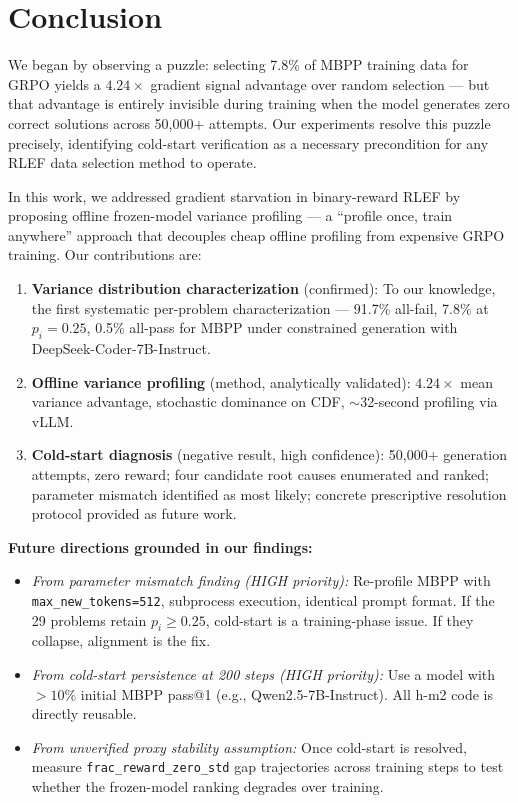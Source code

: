 \section{Conclusion}

We began by observing a puzzle: selecting 7.8\% of MBPP training data for GRPO yields a $4.24\times$ gradient signal advantage over random selection --- but that advantage is entirely invisible during training when the model generates zero correct solutions across 50,000+ attempts. Our experiments resolve this puzzle precisely, identifying cold-start verification as a necessary precondition for any RLEF data selection method to operate.

In this work, we addressed gradient starvation in binary-reward RLEF by proposing offline frozen-model variance profiling --- a ``profile once, train anywhere'' approach that decouples cheap offline profiling from expensive GRPO training. Our contributions are:

\begin{enumerate}
\item \textbf{Variance distribution characterization} (confirmed): To our knowledge, the first systematic per-problem characterization --- 91.7\% all-fail, 7.8\% at $p_i=0.25$, 0.5\% all-pass for MBPP under constrained generation with DeepSeek-Coder-7B-Instruct.

\item \textbf{Offline variance profiling} (method, analytically validated): $4.24\times$ mean variance advantage, stochastic dominance on CDF, $\sim$32-second profiling via vLLM.

\item \textbf{Cold-start diagnosis} (negative result, high confidence): 50,000+ generation attempts, zero reward; four candidate root causes enumerated and ranked; parameter mismatch identified as most likely; concrete prescriptive resolution protocol provided as future work.
\end{enumerate}

\textbf{Future directions grounded in our findings:}

\begin{itemize}
\item \textit{From parameter mismatch finding (HIGH priority):} Re-profile MBPP with \texttt{max\_new\_tokens=512}, subprocess execution, identical prompt format. If the 29 problems retain $p_i\geq0.25$, cold-start is a training-phase issue. If they collapse, alignment is the fix.

\item \textit{From cold-start persistence at 200 steps (HIGH priority):} Use a model with $>10\%$ initial MBPP pass@1 (e.g., Qwen2.5-7B-Instruct). All h-m2 code is directly reusable.

\item \textit{From unverified proxy stability assumption:} Once cold-start is resolved, measure \texttt{frac\_reward\_zero\_std} gap trajectories across training steps to test whether the frozen-model ranking degrades over training.
\end{itemize}


